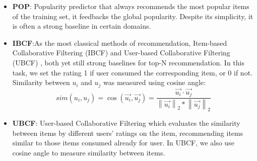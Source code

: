 \documentclass[runningheads]{llncs}
\begin{document}
 \begin{itemize}
\item \textbf{POP}: Popularity predictor that always recommends the most popular items of the training set, it feedbacks the global popularity. Despite its simplicity, it is often a strong baseline in certain domains.
\item \textbf{IBCF}:As the most classical methods of recommendation, Item-based Collaborative Filtering (IBCF) \cite{sarwar2001item}and User-based Collaborative Filtering (UBCF) \cite{Resnick:1994:GOA:192844.192905}, both yet still strong baselines for top-N recommendation. In this task, we set the rating 1 if user consumed the corresponding item, or 0 if not. Similarity between $u_{i}$ and $u_{j}$ was measured using cosine angle:
\begin{equation}
sim(u_{i},u_{j})=\cos (\vec{u_{i}},\vec{u_{j}})=\frac{\vec{u_{i}}\cdot \vec{u_{j}}}{\left \| \vec{u_{i}} \right \|_{2}\ast \left \| \vec{u_{j}} \right \|_{2}}
\end{equation}

\item \textbf{UBCF}: User-based Collaborative Filtering which evaluates the similarity between items by different users' ratings on the item, recommending items similar to those items consumed already for user. In UBCF, we also use cosine angle to measure similarity between items.
\end{itemize}
\end{document}
